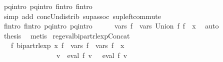 \begin{isabellebody}
\ p{}{\isacharunderscore}{\kern0pt}q{}{\isacharunderscore}{\kern0pt}intro\ p{}{\isacharunderscore}{\kern0pt}q{}{\isacharunderscore}{\kern0pt}intro\ f{}{\isacharprime}{\kern0pt}{\isacharunderscore}{\kern0pt}intro\ f{}{\isacharprime}{\kern0pt}{\isacharunderscore}{\kern0pt}intro\isanewline
\ \ \ \ \isamarkupfalse%
\ {\isacharparenleft}{\kern0pt}simp\ add{\isacharcolon}{\kern0pt}\ conc{\isacharunderscore}{\kern0pt}Un{\isacharunderscore}{\kern0pt}distrib{\isacharparenleft}{\kern0pt}{}{\isacharparenright}{\kern0pt}\ sup{\isacharunderscore}{\kern0pt}assoc\ sup{\isacharunderscore}{\kern0pt}left{\isacharunderscore}{\kern0pt}commute{\isacharparenright}{\kern0pt}\isanewline
\ \ \isamarkupfalse%
\ \isamarkupfalse%
\ f{}{\isacharprime}{\kern0pt}{\isacharunderscore}{\kern0pt}intro\ f{}{\isacharprime}{\kern0pt}{\isacharunderscore}{\kern0pt}intro\ p{}{\isacharunderscore}{\kern0pt}q{}{\isacharunderscore}{\kern0pt}intro\ p{}{\isacharunderscore}{\kern0pt}q{}{\isacharunderscore}{\kern0pt}intro\isanewline
\ \ \ \ \isamarkupfalse%
\ {\isachardoublequoteopen}vars\ {\isacharquery}{\kern0pt}f{\isacharprime}{\kern0pt}\ {\isacharequal}{\kern0pt}\ vars\ {\isacharparenleft}{\kern0pt}Union\ f{}\ f{}{\isacharparenright}{\kern0pt}\ {\isasymunion}\ {\isacharbraceleft}{\kern0pt}x{\isacharbraceright}{\kern0pt}{\isachardoublequoteclose}\ \isamarkupfalse%
\ auto\isanewline
\ \ \isamarkupfalse%
\ \isamarkupfalse%
\ {\isacharquery}{\kern0pt}thesis\ \isamarkupfalse%
\ metis\isanewline
{}\isamarkupfalse%
%
\endisatagproof
{\isafoldproof}%
%
\isadelimproof
\isanewline
%
\endisadelimproof
\isanewline
{}\isamarkupfalse%
\ reg{\isacharunderscore}{\kern0pt}eval{\isacharunderscore}{\kern0pt}bipart{\isacharunderscore}{\kern0pt}rlexp{\isacharunderscore}{\kern0pt}Concat{\isacharcolon}{\kern0pt}\isanewline
\ \ \ {\isachardoublequoteopen}{\isasymexists}f{\isacharprime}{\kern0pt}{\isachardot}{\kern0pt}\ bipart{\isacharunderscore}{\kern0pt}rlexp\ x\ f{\isacharprime}{\kern0pt}\ {\isasymand}\ vars\ f{\isacharprime}{\kern0pt}\ {\isacharequal}{\kern0pt}\ vars\ f{}\ {\isasymunion}\ {\isacharbraceleft}{\kern0pt}x{\isacharbraceright}{\kern0pt}\ {\isasymand}\isanewline
\ \ \ \ \ \ \ \ \ \ \ \ \ \ \ \ {\isacharparenleft}{\kern0pt}{\isasymforall}v{\isachardot}{\kern0pt}\ {\isasymPsi}\ {\isacharparenleft}{\kern0pt}eval\ f{}\ v{\isacharparenright}{\kern0pt}\ {\isacharequal}{\kern0pt}\ {\isasymPsi}\ {\isacharparenleft}{\kern0pt}eval\ f{\isacharprime}{\kern0pt}\ v{\isacharparenright}{\kern0pt}{\isacharparenright}{\kern0pt}{\isachardoublequoteclose}\isanewline

\end{isabellebody}

